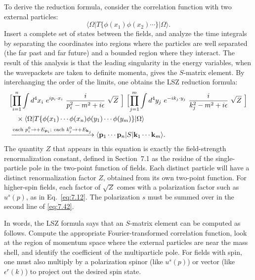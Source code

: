 To derive the reduction formula, consider the correlation function with two
external particles:
\begin{equation}
  \langle\Omega|T\{\phi(x_1)\phi(x_2)\cdots\}|\Omega\rangle .
  \label{eq:7.41}
\end{equation}
Insert a complete set of states between the fields, and analyze the time
integrals by separating the coordinates into regions where the particles are
well separated (the far past and far future) and a bounded region where they
interact.  The result of this analysis is that the leading singularity in the
energy variables, when the wavepackets are taken to definite momenta, gives
the $S$-matrix element.  By interchanging the order of the limits, one obtains
the LSZ reduction formula:
\begin{equation}
  \begin{aligned}
    &\Bigl[ \prod_{i=1}^{n} \int d^4x_i\ e^{ip_i\cdot x_i}\
      \frac{i}{p_i^2-m^2+i\epsilon}\ \sqrt{Z}\ \Bigr]\
    \Bigl[ \prod_{j=1}^{m} \int d^4y_j\ e^{-ik_j\cdot y_j}\
      \frac{i}{k_j^2-m^2+i\epsilon}\ \sqrt{Z}\ \Bigr]\\
    &\quad \times \langle\Omega|T\{\phi(x_1)\cdots\phi(x_n)\phi(y_1)\cdots
      \phi(y_m)\}|\Omega\rangle\\
    &\xrightarrow{\text{each } p_i^0\to +E_{\mathbf{p}_i};\ \text{each }
      k_j^0\to +E_{\mathbf{k}_j}}
    \langle\mathbf{p}_1\cdots\mathbf{p}_n|S|\mathbf{k}_1\cdots
      \mathbf{k}_m\rangle .
  \end{aligned}
  \label{eq:7.42}
\end{equation}
The quantity $Z$ that appears in this equation is exactly the
field-strength renormalization constant, defined in Section~7.1 as the
residue of the single-particle pole in the two-point function of fields.  Each
distinct particle will have a distinct renormalization factor $Z$, obtained
from its own two-point function.  For higher-spin fields, each factor of
$\sqrt{Z}$ comes with a polarization factor such as $u^s(p)$, as in
Eq.~\eqref{eq:7.12}.  The polarization $s$ must be summed over in the second
line of \eqref{eq:7.42}.

In words, the LSZ formula says that an $S$-matrix element can be computed as
follows.  Compute the appropriate Fourier-transformed correlation function,
look at the region of momentum space where the external particles are near
the mass shell, and identify the coefficient of the multiparticle pole.  For
fields with spin, one must also multiply by a polarization spinor (like
$u^s(p)$) or vector (like $\epsilon^r(k)$) to project out the desired spin
state.

